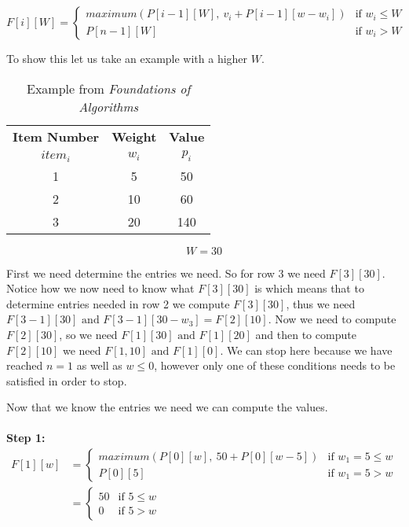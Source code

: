 \begin{equation*}
	F[i][W] = \left\{
	\begin{array}{ll}
		maximum(P[i-1][W], \ v_i + P[i-1][w-w_i]) & \mbox{if }  w_i \leq W \\
		P[n-1][W]& \mbox{if } w_i > W
	\end{array}
	\right.
\end{equation*}

To show this let us take an example with a higher $W$. 
\begin{table}[h!]
	\begin{center}
		\caption{Example from \textit{Foundations of Algorithms} \cite{neopolitan_foundations_nodate}}
		\label{tab:example3}
		\begin{tabular}{c|c|c}
			\toprule %
			\textbf{Item Number} & \textbf{Weight} & \textbf{Value}\\
			$item_i$ & $w_i$ & $p_i$ \\
			\midrule %
			1 & 5 & 50 \\
			2 & 10 & 60 \\
			3 & 20 & 140 \\ 
		\end{tabular}
	\end{center} \vspace{12pt}
	$$
	W = 30
	$$
\end{table}

First we need determine the entries we need. So for row 3 we need $F[3][30]$. Notice how we now need to know what $F[3][30]$ is which means that to determine entries needed in row 2 we compute $F[3][30]$, thus we need $F[3-1][30] \mbox{ and } F[3-1][30-w_3] = F[2][10]$. Now we need to compute $F[2][30]$, so we need $F[1][30] \mbox{ and } F[1][20]$ and then to compute $F[2][10]$ we need $F[1, 10] \mbox{ and } F[1][0]$. We can stop here because we have reached $n = 1$ as well as $w \leq 0$, however only one of these conditions needs to be satisfied in order to stop.

\forceindent Now that we know the entries we need we can compute the values. \\ \\
\textbf{Step 1: }
\begin{align*}
	F[1][w] &= 
	\begin{cases}
		maximum(P[0][w], \ 50 + P[0][w-5]) & \mbox{if }  w_1 = 5 \leq w \\
		P[0][5] & \mbox{if } w_1 = 5 > w
	\end{cases} \\
	&= 
	\begin{cases}
		50 & \mbox{if }  5 \leq w \\
		0 & \mbox{if } 5 > w
	\end{cases}
\end{align*}

